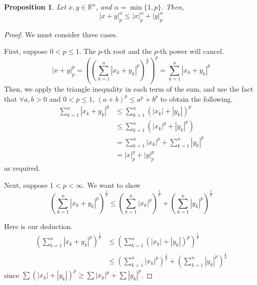\documentclass[letterpaper,11pt]{article}
\newtheorem{prop}{Proposition}
\newcommand{\R}{\mathbb{R}}
\newcommand{\inv}[1]{\frac{1}{#1}}
\begin{document}
\begin{enumerate}
        \begin{prop}
            Let $x, y \in \R^n$, and $\alpha = \min\{1, p\}$. Then,
            \begin{equation*}
                |x + y|_p^\alpha \leq |x|_p^\alpha + |y|_p^\alpha
            \end{equation*}
        \end{prop}

        \begin{proof}
            We must consider three cases.

            First, suppose $0 < p \leq 1$. The $p$-th root and the $p$-th power
            will cancel.
            \begin{equation*}
                |x + y|_p^p
                = \left(
                \left( \sum_{k=1}^n |x_k + y_k|^p \right) ^ \frac{1}{p}
                \right) ^ p
                = \sum_{k=1}^n |x_k + y_k|^p
            \end{equation*}
            Then, we apply the triangle inequality in each term of the sum, and
            use the fact that $\forall a,b > 0$ and $0 < p \leq 1$,
            $(a + b)^p \leq a^p + b^p$ to obtain the following.
            \begin{align*}
                \sum_{k=1}^n |x_k + y_k|^p
                &\leq \sum_{k=1}^n (|x_k| + |y_k|)^p \\
                &\leq \sum_{k=1}^n (|x_k|^p + |y_k|^p) \\
                &= \sum_{k=1}^n |x_k|^p + \sum_{k=1}^n |y_k|^p \\
                &= |x|_p^p + |y|_p^p
            \end{align*}
            as required.

            Next, suppose $1 < p < \infty$. We want to show
            \begin{equation*}
                \left(\sum_{k=1}^n |x_k + y_k|^p \right)^\frac{1}{p}
                \leq
                \left(\sum_{k=1}^n |x_k|^p \right)^\frac{1}{p}
                +
                \left(\sum_{k=1}^n |y_k|^p \right)^\frac{1}{p}
            \end{equation*}

            Here is our deduction.
            \begin{align*}
                \left(\sum_{k=1}^n |x_k + y_k|^p\right)^\inv{p}
                &\leq \left(\sum_{k=1}^n (|x_k| + |y_k|)^p\right)^\inv{p} \\
                &\leq \left(\sum_{k=1}^n |x_k|^p\right)^\inv{p}
                + \left(\sum_{k=1}^n |y_k|^p\right)^\inv{p}
            \end{align*}
            since $\sum (|x_k| + |y_k|)^p \geq \sum |x_k|^p + \sum |y_k|^p$.


\end{proof}
\end{enumerate}
\end{document}
